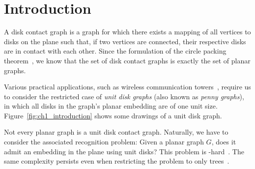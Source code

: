 
\chapter{Introduction}

A disk contact graph is a graph for which there exists a mapping of all vertices to disks on the plane such that, if two vertices are connected, their respective disks are in contact with each other.
Since the formulation of the circle packing theorem~\cite{Koebe1936}, we know that the set of disk contact graphs is exactly the set of planar graphs.

Various practical applications, such as wireless communication towers~\cite{Hale1980}, require us to consider the restricted case of \emph{unit disk graphs} (also known as \emph{penny graphs}), in which all disks in the graph's planar embedding are of one unit size. Figure~\ref{fig:ch1_introduction} shows some drawings of a unit disk graph.

Not every planar graph is a unit disk contact graph. Naturally, we have to consider the associated recognition problem: Given a planar graph $G$, does it admit an embedding in the plane using unit disks? 
This problem is \NP-hard~\cite{Breu1998}. The same complexity persists even when restricting the problem to only trees~\cite{Bowen2015}.

